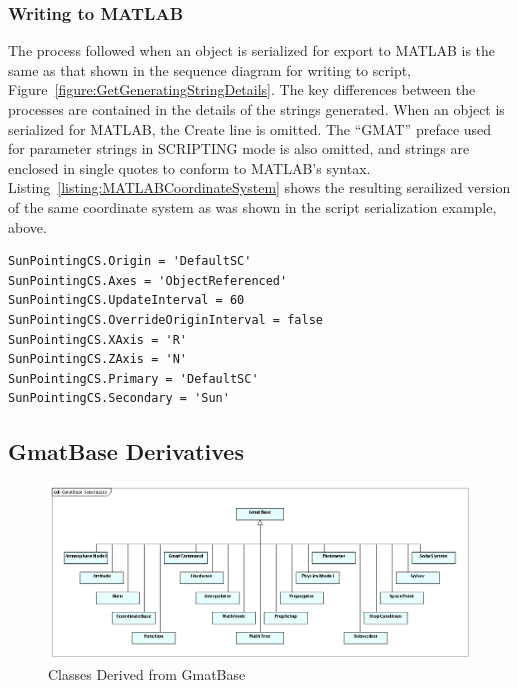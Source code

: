 \subsubsection{Writing to MATLAB}

The process followed when an object is serialized for export to MATLAB is the same as that shown in
the sequence diagram for writing to script, Figure~\ref{figure:GetGeneratingStringDetails}.  The
key differences between the processes are contained in the details of the strings generated.  When
an object is serialized for MATLAB, the Create line is omitted.  The ``GMAT'' preface used for
parameter strings in SCRIPTING mode is also omitted, and strings are enclosed in single quotes to
conform to MATLAB's syntax.  Listing~\ref{listing:MATLABCoordinateSystem} shows the resulting
serailized version of the same coordinate system as was shown in the script serialization example,
above.

\begin{lstlisting}[caption={MATLAB Listing for a Coordinate System},
label={listing:MATLABCoordinateSystem}]
SunPointingCS.Origin = 'DefaultSC'
SunPointingCS.Axes = 'ObjectReferenced'
SunPointingCS.UpdateInterval = 60
SunPointingCS.OverrideOriginInterval = false
SunPointingCS.XAxis = 'R'
SunPointingCS.ZAxis = 'N'
SunPointingCS.Primary = 'DefaultSC'
SunPointingCS.Secondary = 'Sun'
\end{lstlisting}
\lstset{numbers=none}

\subsection{GmatBase Derivatives}

\begin{figure}[htb]
\begin{center}
\includegraphics[455,185]{Images/GmatBaseSubclasses.png}
\caption{\label{figure:GmatBaseSubclasses}Classes Derived from GmatBase}
\end{center}
\end{figure}

